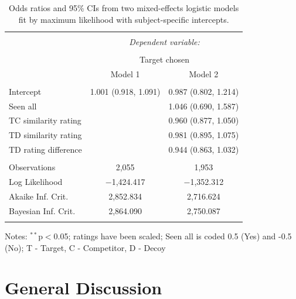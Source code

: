 \documentclass[12pt, a4paper]{article}
\begin{document}
\begin{table}[htb]
\centering
  \begin{threeparttable}
    \caption{Odds ratios and 95\% CIs from two mixed-effects logistic models fit by maximum likelihood with subject-specific intercepts.}
  \label{latentattr_exp2reg}
\begin{tabular}{@{\extracolsep{5pt}}lcc}
\\[-1.8ex]\hline
\hline \\[-1.8ex]
 & \multicolumn{2}{c}{\textit{Dependent variable:}} \\
\cline{2-3}
\\[-1.8ex] & \multicolumn{2}{c}{Target chosen} \\
 & Model 1 & Model 2 \\
\hline \\[-1.8ex]
 Intercept & 1.001 (0.918, 1.091) & 0.987 (0.802, 1.214) \\
  Seen all &  & 1.046 (0.690, 1.587) \\
  TC similarity rating &  & 0.960 (0.877, 1.050) \\
  TD similarity rating &  & 0.981 (0.895, 1.075) \\
  TD rating difference &  & 0.944 (0.863, 1.032) \\
 \hline \\[-1.8ex]
Observations & 2,055 & 1,953 \\
Log Likelihood & $-$1,424.417 & $-$1,352.312 \\
Akaike Inf. Crit. & 2,852.834 & 2,716.624 \\
Bayesian Inf. Crit. & 2,864.090 & 2,750.087 \\
\hline
\hline \\[-1.8ex]
\end{tabular}
    \begin{tablenotes}
      \small
      \item Notes: $^{**}$p$<$0.05; ratings have been scaled; Seen all is coded 0.5 (Yes) and -0.5 (No); T - Target, C - Competitor, D - Decoy
    \end{tablenotes}
  \end{threeparttable}
\end{table}

\section*{General Discussion}
\end{document}
